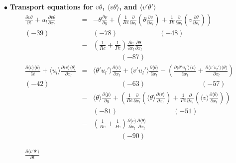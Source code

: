 \documentclass[a4paper,11pt]{article}
\begin{document}
\noindent $\bullet$  \textbf{Transport equations for $v\theta$, $\langle v\theta\rangle$, and $\langle v'\theta'\rangle$}
\begin{eqnarray}
\frac{\partial v\theta }{\partial t}
+u_l\frac{\partial v\theta }{\partial x_l}
&=&-\theta\frac{\partial p}{\partial y}
+(\frac{1}{Re}\frac{\partial }{\partial x_l}(\theta\frac{\partial v }{\partial x_l})+\frac{1}{Pe}\frac{\partial }{\partial x_l}(v\frac{\partial \theta }{\partial x_l})) \nonumber \\
(-39)    && (-78) \qquad{} \quad{}\quad{} \qquad{} (-48) \nonumber \\
&-&(\frac{1}{Re}+\frac{1}{Pe})\frac{\partial v }{\partial x_l}\frac{\partial \theta }{\partial x_l}  \\ 
 &&  \qquad{} \qquad{} (-87) \nonumber \\
\frac{\partial \langle v\rangle \langle \theta\rangle }{\partial t}
+\langle u_l\rangle \frac{\partial \langle v\rangle \langle \theta\rangle }{\partial x_l}
&=&\langle \theta'u_l'\rangle \frac{\partial \langle v \rangle}{\partial x_l}+\langle v'u_l'\rangle \frac{\partial \langle \theta \rangle  }{\partial x_l}
-(\frac{\partial \langle \theta'u_l'\rangle \langle v \rangle }{\partial x_l}+\frac{\partial \langle v'u_l'\rangle \langle \theta \rangle }{\partial x_l}) \nonumber \\
(-42) \quad{}   && \qquad{} \qquad{} (-63)\quad{}\quad{}\quad{} \qquad{}\quad{}\qquad{} (-57) \nonumber \\
&-&\langle \theta \rangle \frac{\partial \langle p \rangle }{\partial y}
+(\frac{1}{Re}\frac{\partial}{\partial x_l}(\langle \theta\rangle \frac{\partial \langle v\rangle}{\partial x_l}) + \frac{1}{Pe}\frac{\partial}{\partial x_l}(\langle v \rangle \frac{\partial \langle \theta\rangle}{\partial x_l})) \nonumber \\
&& (-81) \qquad{} \qquad{} \quad{}\quad{}\qquad{} (-51) \nonumber \\
&-&(\frac{1}{Re}+\frac{1}{Pe})\frac{\partial \langle v\rangle }{\partial x_l}\frac{\partial \langle \theta \rangle}{\partial x_l} \\
&&  \qquad{} \qquad{} (-90) \nonumber \\
\nonumber \\
\nonumber \\
\frac{\partial \langle v'\theta'\rangle }{\partial t}

\end{eqnarray}
\end{document}
